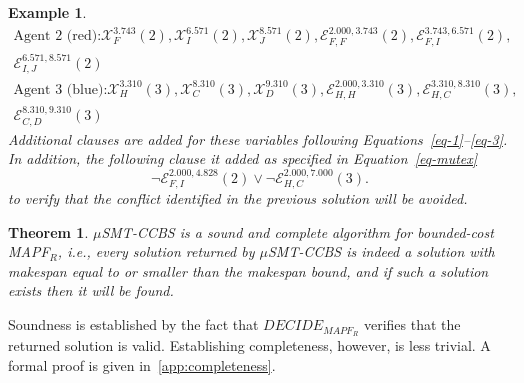 \documentclass[review]{elsarticle}
\newtheorem{theorem}{Theorem}
\newtheorem{example}{Example}
\newcommand{\decidemapfr}{\ensuremath{\mathit{DECIDE_{MAPF_R}}}\xspace}
\newcommand{\mapfr}{\ac{MAPF}$_R$\xspace}
\newcommand{\musmtccbs}{\ensuremath{\mu}SMT-CCBS\xspace}
\begin{document}
\begin{example}
\begin{multline*}
\text{Agent 2 (red):} \mathcal{X}_F^{3.743}(2), \mathcal{X}_I^{6.571}(2), \mathcal{X}_J^{8.571}(2), \mathcal{E}_{F,F}^{2.000,3.743}(2), \mathcal{E}_{F,I}^{3.743,6.571}(2),\\ \mathcal{E}_{I,J}^{6.571,8.571}(2)    
\end{multline*}
\begin{multline*}
    \text{Agent 3 (blue):}
    \mathcal{X}_H^{3.310}(3), \mathcal{X}_C^{8.310}(3),
\mathcal{X}_D^{9.310}(3), 
\mathcal{E}_{H,H}^{2.000,3.310}(3), \mathcal{E}_{H,C}^{3.310,8.310}(3),\\ \mathcal{E}_{C,D}^{8.310,9.310}(3)
\end{multline*}
Additional clauses are added for these variables following Equations~\ref{eq-1}--\ref{eq-3}. 
In addition, the following clause it added as specified in Equation~\ref{eq-mutex}
\begin{equation}
  \neg \mathcal{E}_{F,I}^{2.000,4.828}(2) \vee \neg \mathcal{E}_{H,C}^{2.000,7.000}(3).
\end{equation}
to verify that the conflict identified in the previous solution will be avoided.
\end{example}

\begin{theorem}
	\musmtccbs is a sound and complete algorithm for bounded-cost \mapfr, 
	i.e., every solution returned by \musmtccbs is indeed a solution with makespan equal to or smaller than the makespan bound, 
	and if such a solution exists then it will be found. 
	\label{the:bounded-cost-makespan}
\end{theorem}
Soundness is established by the fact that \decidemapfr verifies that the returned solution is valid. Establishing completeness, however, is less trivial. A formal proof is given in~\ref{app:completeness}. 
\end{document}
